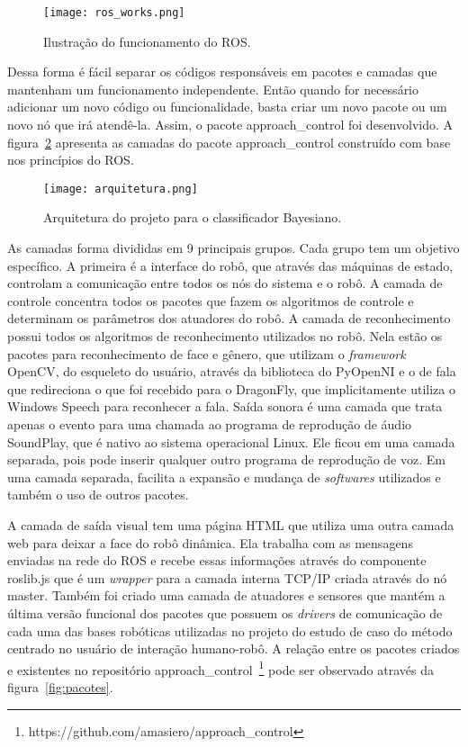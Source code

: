 \begin{figure}[ht!]
	\centering
	\begin{minipage}{0.6\textwidth}
		\caption{Ilustração do funcionamento do ROS.}
		\texttt{[image: ros\_works.png]}
		\label{fig:ros_works}
	\end{minipage}
\end{figure}

Dessa forma é fácil separar os códigos responsáveis em pacotes e camadas que mantenham um funcionamento independente. Então quando for necessário adicionar um novo código ou funcionalidade, basta criar um novo pacote ou um novo nó que irá atendê-la. Assim, o pacote approach\_control foi desenvolvido. A figura~\ref{fig:arquitetura} apresenta as camadas do pacote approach\_control construído com base nos princípios do ROS.

\begin{figure}[ht!]
	\centering
	\begin{minipage}{0.9\textwidth}
		\caption{Arquitetura do projeto para o classificador Bayesiano.}
		\texttt{[image: arquitetura.png]}
		\label{fig:arquitetura}
	\end{minipage}
\end{figure}

As camadas forma divididas em 9 principais grupos. Cada grupo tem um objetivo específico. A primeira é a interface do robô, que através das máquinas de estado, controlam a comunicação entre todos os nós do sistema e o robô. A camada de controle concentra todos os pacotes que fazem os algoritmos de controle e determinam os parâmetros dos atuadores do robô. A camada de reconhecimento possui todos os algoritmos de reconhecimento utilizados no robô. Nela estão os pacotes para reconhecimento de face e gênero, que utilizam o \textit{framework} OpenCV, do esqueleto do usuário, através da biblioteca do PyOpenNI e o de fala que redireciona o que foi recebido para o DragonFly, que implicitamente utiliza o Windows Speech para reconhecer a fala. Saída sonora é uma camada que trata apenas o evento para uma chamada ao programa de reprodução de áudio SoundPlay, que é nativo ao sistema operacional Linux. Ele ficou em uma camada separada, pois pode inserir qualquer outro programa de reprodução de voz. Em uma camada separada, facilita a expansão e mudança de \textit{softwares} utilizados e também o uso de outros pacotes.

A camada de saída visual tem uma página HTML que utiliza uma outra camada web para deixar a face do robô dinâmica. Ela trabalha com as mensagens enviadas na rede do ROS e recebe essas informações através do componente roslib.js que é um \textit{wrapper} para a camada interna TCP/IP criada através do nó master. Também foi criado uma camada de atuadores e sensores que mantém a última versão funcional dos pacotes que possuem os \textit{drivers} de comunicação de cada uma das bases robóticas utilizadas no projeto do estudo de caso do método centrado no usuário de interação humano-robô. A relação entre os pacotes criados e existentes no repositório approach\_control~\footnote{https://github.com/amasiero/approach\_control} pode ser observado através da figura~\ref{fig:pacotes}.

